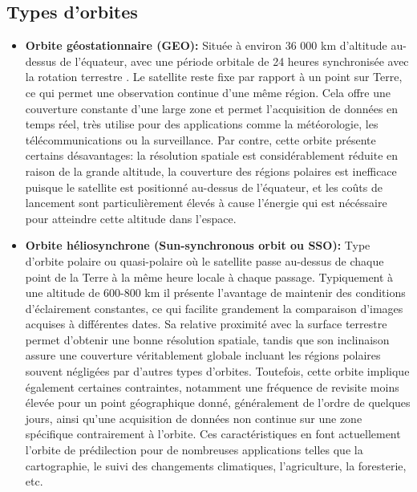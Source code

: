 \documentclass[12pt,a4paper]{article}
\begin{document}
\subsection{Types d'orbites}
\begin{itemize}[label=---]
    
    
    \item \textbf{Orbite géostationnaire (GEO):} Située à environ 36 000 km d'altitude au-dessus de l'équateur, avec une période orbitale de 24 heures synchronisée avec la rotation terrestre \citep{Weather2023,Capderou2014}. Le satellite reste fixe par rapport à un point sur Terre, ce qui permet une observation continue d'une même région. Cela offre une couverture constante d'une large zone et permet l'acquisition de données en temps réel, très utilise pour des applications comme la météorologie, les télécommunications ou la surveillance. Par contre, cette orbite présente certains désavantages: la résolution spatiale est considérablement réduite en raison de la grande altitude, la couverture des régions polaires est inefficace puisque le satellite est positionné au-dessus de l'équateur, et les coûts de lancement sont particulièrement élevés à cause l'énergie qui est nécéssaire pour atteindre cette altitude dans l'espace.
    \vspace{1em}    
    
    \item \textbf{Orbite héliosynchrone (Sun-synchronous orbit ou SSO):} Type d'orbite polaire ou quasi-polaire où le satellite passe au-dessus de chaque point de la Terre à la même heure locale à chaque passage. Typiquement à une altitude de 600-800 km il présente l'avantage de maintenir des conditions d'éclairement constantes, ce qui facilite grandement la comparaison d'images acquises à différentes dates. Sa relative proximité avec la surface terrestre permet d'obtenir une bonne résolution spatiale, tandis que son inclinaison assure une couverture véritablement globale incluant les régions polaires souvent négligées par d'autres types d'orbites. Toutefois, cette orbite implique également certaines contraintes, notamment une fréquence de revisite moins élevée pour un point géographique donné, généralement de l'ordre de quelques jours, ainsi qu'une acquisition de données non continue sur une zone spécifique contrairement à l'orbite. Ces caractéristiques en font actuellement l'orbite de prédilection pour de nombreuses applications telles que la cartographie, le suivi des changements climatiques, l'agriculture, la foresterie, etc.
    \vspace{1em}
    

\end{itemize}
\end{document}
